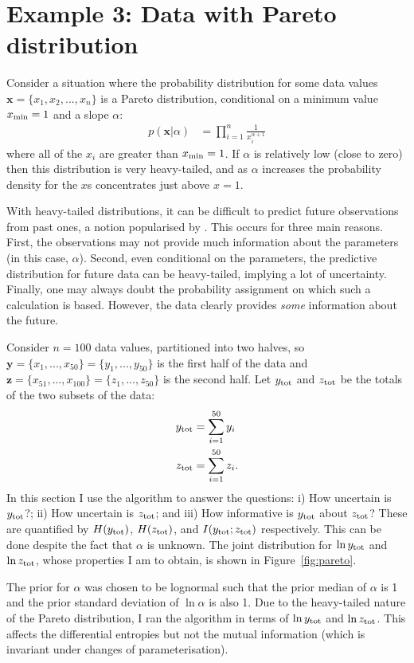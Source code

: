 \documentclass[entropy,article,accept,oneauthor,pdftex,10pt,a4paper]{mdpi}
\newcommand{\ytot}{y_{\rm tot}}
\newcommand{\ztot}{z_{\rm tot}}
\begin{document}
\section{Example 3: Data with Pareto distribution}

Consider a situation where the probability distribution for some data values
$\boldsymbol{x} = \{x_1, x_2, ..., x_n\}$ is a Pareto distribution, conditional on
a minimum value $x_{\rm min}=1$ and a slope $\alpha$:
\begin{align}
p(\boldsymbol{x} | \alpha) &= \prod_{i=1}^n \frac{1}{x_i^{\alpha + 1}}
\end{align}
where all of the $x_i$ are greater than $x_{\rm min} = 1$.
If $\alpha$ is relatively low (close to zero) then this distribution is
very heavy-tailed, and as $\alpha$ increases the probability density
for the $x$s concentrates just above $x=1$.

With heavy-tailed distributions, it can be difficult to predict future
observations from past ones, a notion popularised by
\citet{taleb2007black}. This occurs for three main reasons.
First, the observations may not
provide much information about the parameters (in this case, $\alpha$).
Second, even conditional on the parameters, the predictive distribution for
future data can be heavy-tailed, implying a lot of uncertainty.
Finally, one may always doubt the probability assignment on which such a
calculation is based.
However, the data clearly provides {\em some} information about the future.

Consider $n=100$ data values, partitioned into two halves, so
$\boldsymbol{y} = \{x_1, ..., x_{50}\} = \{y_1, ..., y_{50}\}$
is the first half of the data and
$\boldsymbol{z} = \{x_{51}, ..., x_{100}\} = \{z_1, ..., z_{50}\}$
is the second half. Let $\ytot$ and $\ztot$ be the totals of the two
subsets of the data:
\begin{align}
\ytot &= \sum_{i=1}^{50} y_i \\
\ztot &= \sum_{i=1}^{50} z_i.
\end{align}
In this section I use the algorithm to answer the questions:
i) How uncertain is $\ytot$?; ii) How uncertain is $\ztot$; and
iii) How informative is $\ytot$ about $\ztot$? These are quantified by
$H(\ytot)$, $H(\ztot)$, and $I(\ytot; \ztot)$ respectively. This can
be done despite the fact that $\alpha$ is unknown. The joint distribution
for $\ln \ytot$ and $\ln \ztot$, whose properties I am to obtain,
is shown in Figure~\ref{fig:pareto}.

The prior for $\alpha$ was chosen to be lognormal such that the prior median
of $\alpha$ is 1 and the prior standard deviation of $\ln \alpha$ is also 1.
Due to the heavy-tailed nature of the Pareto distribution, I ran the
algorithm in terms of $\ln \ytot$ and $\ln \ztot$. This affects the
differential entropies but not the mutual information (which is invariant 
under changes of parameterisation).
\end{document}
